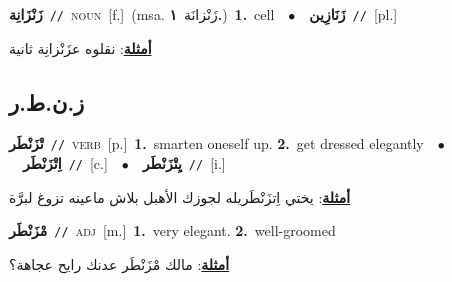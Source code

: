\documentclass[10pt,a4paper,twoside]{article} %
\begin{document}
\begin{multicols}{2}
{\setlength\topsep{0pt}\textbf{\foreignlanguage{arabic}{زَنْزَانِة}}\ {\color{gray}\texttt{//}\color{black}}\ \textsc{noun}\ [f.]\ \color{gray}(msa. \foreignlanguage{arabic}{زَنْزانَة}~\foreignlanguage{arabic}{\textbf{١.}})\color{black}\ \textbf{1.}~cell\ \ $\bullet$\ \ \setlength\topsep{0pt}\textbf{\foreignlanguage{arabic}{زَنَازِين}}\ {\color{gray}\texttt{//}\color{black}}\ [pl.]\  \begin{flushright}\color{gray}\foreignlanguage{arabic}{\textbf{\underline{\foreignlanguage{arabic}{أمثلة}}}: نقلوه عزَنْزانِة ثانية}\end{flushright}\color{black}} \vspace{2mm}

\vspace{-3mm}
\subsection*{\color{blue}\foreignlanguage{arabic}{ز.ن.ط.ر}\color{blue}{}} 

{\setlength\topsep{0pt}\textbf{\foreignlanguage{arabic}{تْزَنْطَر}}\ {\color{gray}\texttt{//}\color{black}}\ \textsc{verb}\ [p.]\ \textbf{1.}~smarten oneself up.  \textbf{2.}~get dressed elegantly\ \ $\bullet$\ \ \setlength\topsep{0pt}\textbf{\foreignlanguage{arabic}{اِتْزَنْطَر}}\ {\color{gray}\texttt{//}\color{black}}\ [c.]\ \ $\bullet$\ \ \setlength\topsep{0pt}\textbf{\foreignlanguage{arabic}{يِتْزَنْطَر}}\ {\color{gray}\texttt{//}\color{black}}\ [i.]\  \begin{flushright}\color{gray}\foreignlanguage{arabic}{\textbf{\underline{\foreignlanguage{arabic}{أمثلة}}}: يختي اِتزَنْطَريله لجوزك الأهبل بلاش ماعينه تزوغ لبرَّة}\end{flushright}\color{black}} \vspace{2mm}

{\setlength\topsep{0pt}\textbf{\foreignlanguage{arabic}{مْزَنْطَر}}\ {\color{gray}\texttt{//}\color{black}}\ \textsc{adj}\ [m.]\ \textbf{1.}~very elegant.  \textbf{2.}~well-groomed\  \begin{flushright}\color{gray}\foreignlanguage{arabic}{\textbf{\underline{\foreignlanguage{arabic}{أمثلة}}}: مالك مْزَنْطَر عدنك رايح عجاهة؟}\end{flushright}\color{black}} \vspace{2mm}


\end{multicols}
\end{document}
